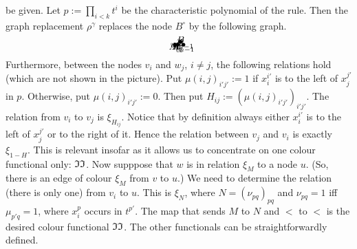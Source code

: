 be given. Let $p := \prod_{i < k} t^i$ be the characteristic
polynomial of the rule. Then the graph replacement $\rho^{\gamma}$
replaces the node $B^{\circ}$ by the following graph.
\begin{equation}
\begin{array}{l}
\begin{picture}(12,10)
\put(2,3){\makebox(0,0){$\bullet$}}
\put(2,2){\makebox(0,0){$v_0$}}
\put(2,.5){\makebox(0,0){$A_0^{\circ}$}}
\put(2,3){\line(2,1){6}}
\put(5,3){\makebox(0,0){$\bullet$}}
\put(5,2){\makebox(0,0){$v_1$}}
\put(5,.5){\makebox(0,0){$A_1^{\circ}$}}
\put(5,3){\line(1,1){3}}
\put(8,3){\makebox(0,0){$\dotsb$}}
\put(11,3){\makebox(0,0){$\bullet$}}
\put(11,2){\makebox(0,0){$x_{n-1}$}}
\put(11,.5){\makebox(0,0){$A_{n-1}^{\circ}$}}
\put(11,3){\line(-1,1){3}}
\put(8,6){\makebox(0,0){$\bullet$}}
\put(8,7){\makebox(0,0){$w$}}
\put(8,8.5){\makebox(0,0){$B$}}
\end{picture}
\end{array}
\end{equation}
Furthermore, between the nodes $v_i$ and $w_j$, $i \neq j$, the 
following relations hold (which are not shown in the picture).
Put $\mu(i,j)_{i'j'} := 1$ if $x_i^{i'}$ is to the left of
$x_j^{j'}$ in $p$. Otherwise, put $\mu(i,j)_{i'j'} := 0$. 
Then put $H_{ij} := (\mu(i,j)_{i'j'})_{i'j'}$. The relation 
from $v_i$ to $v_j$ is $\xi_{H_{ij}}$. Notice that by definition 
always either $x_i^{i'}$ is to the left of $x_j^{j'}$ or to the 
right of it. Hence the relation between $v_j$ and $v_i$ is exactly 
$\xi_{1 - H}$. This is relevant insofar as it allows us to 
concentrate on one colour functional only: $\mathfrak{I}\mathfrak{I}$. Now supppose 
that $w$ is in relation $\xi_M$ to a node $u$. (So, there is an 
edge of colour $\xi_M$ from $v$ to $u$.) We need to determine the 
relation (there is only one) from $v_i$ to $u$. This is $\xi_N$, 
where $N = (\nu_{pq})_{pq}$ and $\nu_{pq} = 1$ iff 
$\mu_{p'q} = 1$, where $x_i^p$ occurs in $t^{p'}$. 
The map that sends $M$ to $N$ and $<$ to $<$ is the desired 
colour functional $\mathfrak{I}\mathfrak{I}$. The other functionals can be 
straightforwardly defined.

